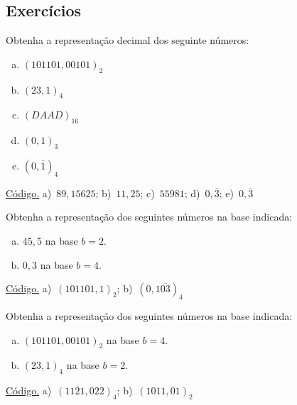 \subsection{Exercícios}

\begin{exer}\label{exer:base2dec}
  Obtenha a representação decimal dos seguinte números:
  \begin{enumerate}[a)]
  \item $(101101,00101)_2$
  \item $(23,1)_4$
  \item $(DAAD)_{16}$
  \item $(0,1)_3$
  \item $(0,\overline{1})_4$
  \end{enumerate}
\end{exer}
\begin{resp}
    \ifisoctave 
  \href{https://github.com/phkonzen/notas/blob/master/src/MatematicaNumerica/cap_aritm/dados/exer_base2dec/exer_base2dec.m}{Código.} 
  \fi
  a)~$89,15625$; b)~$11,25$; c)~$55981$; d)~$0,\overline{3}$; e)~$0,\overline{3}$
\end{resp}

\begin{exer}\label{exer_dec2base}
  Obtenha a representação dos seguintes números na base indicada:
  \begin{enumerate}[a)]
  \item $45,5$ na base $b=2$.
  \item $0,3$ na base $b=4$.
  \end{enumerate}
\end{exer}
\begin{resp}
  \ifisoctave 
  \href{https://github.com/phkonzen/notas/blob/master/src/MatematicaNumerica/cap_aritm/dados/exer_dec2base/exer_dec2base.m}{Código.} 
  \fi
  a)~$(101101,1)_2$; b)~$(0,1\overline{03})_4$
\end{resp}

\begin{exer}\label{exer_base2base}
  Obtenha a representação dos seguintes números na base indicada:
  \begin{enumerate}[a)]
  \item $(101101,00101)_2$ na base $b=4$.
  \item $(23,1)_4$ na base $b=2$.
  \end{enumerate}
\end{exer}
\begin{resp}
  \ifisoctave 
  \href{https://github.com/phkonzen/notas/blob/master/src/MatematicaNumerica/cap_aritm/dados/exer_base2base/exer_base2base.m}{Código.} 
  \fi
  a)~$(1121,022)_4$; b)~$(1011,01)_2$  
\end{resp}

